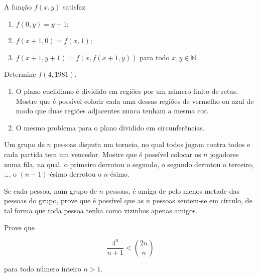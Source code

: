 \begin{questao}
  A função $f(x,y)$ satisfaz

  \begin{enumerate}

  \item $f(0,y) = y+1$;

  \item $f(x+1,0) = f(x,1)$;

  \item $f(x+1,y+1) = f(x,f(x+1,y))$ para todo $x,y \in \mathbb{N}$.
  \end{enumerate}

  Determine $f(4,1981)$.
\end{questao}

\begin{questao}
  \begin{enumerate}

  \item O plano euclidiano é dividido em regiões por um número finito de
    retas. Mostre que é possível colorir cada uma dessas regiões de vermelho ou
    azul de modo que duas regiões adjacentes nunca tenham a mesma cor.

  \item O mesmo problema para o plano dividido em circunferências.
  \end{enumerate}
\end{questao}

\begin{questao}
  Um grupo de $n$ pessoas disputa um torneio, no qual todos jogam contra todos e
  cada partida tem um vencedor. Mostre que é possível colocar os $n$ jogadores
  numa fila, na qual, o primeiro derrotou o segundo, o segundo derrotou o
  terceiro, \ldots, o $(n-1)$-ésimo derrotou o $n$-ésimo.
\end{questao}

\begin{questao}
  Se cada pessoa, num grupo de $n$ pessoas, é amiga de pelo menos metade das
  pessoas do grupo, prove que é possível que as $n$ pessoas sentem-se em
  círculo, de tal forma que toda pessoa tenha como vizinhos apenas amigos.
\end{questao}

\begin{questao}
  Prove que

  $$ \frac{4^n}{n+1} < \binom{2n}{n} $$

  para todo número inteiro $n>1$.
\end{questao}


